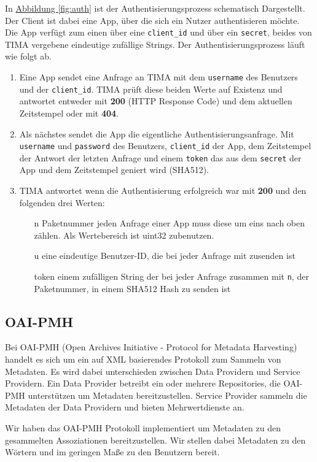 In \hyperref[fig:auth]{Abbildung \ref*{fig:auth}} ist der Authentisierungsprozess schematisch Dargestellt. Der Client ist dabei eine App, über die sich ein Nutzer authentisieren möchte. Die App verfügt zum einen über eine \texttt{client\_id} und über ein \texttt{secret}, beides von TIMA vergebene eindeutige zufällige Strings. Der Authentisierungsprozess läuft wie folgt ab.
\begin{enumerate}
	\item Eine App sendet eine Anfrage an TIMA mit dem \texttt{username} des Benutzers und der \texttt{client\_id}. TIMA prüft diese beiden Werte auf Existenz und antwortet entweder mit \textbf{200} (HTTP Response Code) und dem aktuellen Zeitstempel oder mit \textbf{404}.
	\item Als nächstes sendet die App die eigentliche Authentisierungsanfrage. Mit \texttt{username} und \texttt{password} des Benutzers, \texttt{client\_id} der App, dem Zeitstempel der Antwort der letzten Anfrage und einem \texttt{token} das aus dem \texttt{secret} der App und dem Zeitstempel geniert wird (SHA512).
	\item TIMA antwortet wenn die Authentisierung erfolgreich war mit \textbf{200} und den folgenden drei Werten:
	\begin{itemize}
		\item[n] Paketnummer jeden Anfrage einer App muss diese um eins nach oben zählen. Als Wertebereich ist uint32 zubenutzen.
		\item[u] eine eindeutige Benutzer-ID, die bei jeder Anfrage mit zusenden ist
		\item[token] einem zufälligen String der bei jeder Anfrage zusammen mit \texttt{n}, der Paketnummer, in einem SHA512 Hash zu senden ist
	\end{itemize}
\end{enumerate}

\subsection{OAI-PMH}\label{sec:oai-pmh}
Bei OAI-PMH (Open Archives Initiative - Protocol for Metadata Harvesting) handelt es sich um ein auf XML basierendes Protokoll zum Sammeln von Metadaten. Es wird dabei unterschieden zwischen Data Providern und Service Providern. Ein Data Provider betreibt ein oder mehrere Repositories, die OAI-PMH unterstützen um Metadaten bereitzustellen. Service Provider sammeln die Metadaten der Data Providern und bieten Mehrwertdienste an.

Wir haben das OAI-PMH Protokoll implementiert um Metadaten zu den gesammelten Assoziationen bereitzustellen. Wir stellen dabei Metadaten zu den Wörtern und im geringen Maße zu den Benutzern bereit.